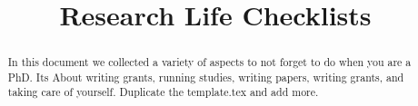 \documentclass[14pt, a5paper]{extarticle}
\title{Research Life Checklists}
\date{}
\begin{document}
\selectfont{}
\maketitle
\begin{abstract}
    In this document we collected a variety of aspects to not forget to do when you are a PhD. Its About writing grants, running studies, writing papers, writing grants, and taking care of yourself. Duplicate the template.tex and add more.
\end{abstract}
\tableofcontents
\centering
\newpage











\printbibliography


\end{document}
